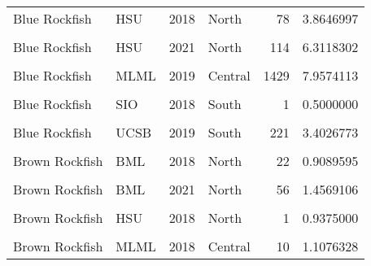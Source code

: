 \documentclass[
]{article}
\begin{document}
\begin{longtable}[t]{llrlrr}
Blue Rockfish & HSU & 2018 & North & 78 & 3.8646997\\
\addlinespace
\cellcolor{gray!6}{Blue Rockfish} & \cellcolor{gray!6}{HSU} & \cellcolor{gray!6}{2019} & \cellcolor{gray!6}{North} & \cellcolor{gray!6}{54} & \cellcolor{gray!6}{2.5111033}\\
Blue Rockfish & HSU & 2021 & North & 114 & 6.3118302\\
\cellcolor{gray!6}{Blue Rockfish} & \cellcolor{gray!6}{MLML} & \cellcolor{gray!6}{2018} & \cellcolor{gray!6}{Central} & \cellcolor{gray!6}{1866} & \cellcolor{gray!6}{9.9771759}\\
Blue Rockfish & MLML & 2019 & Central & 1429 & 7.9574113\\
\cellcolor{gray!6}{Blue Rockfish} & \cellcolor{gray!6}{MLML} & \cellcolor{gray!6}{2021} & \cellcolor{gray!6}{Central} & \cellcolor{gray!6}{473} & \cellcolor{gray!6}{3.3025650}\\
\addlinespace
Blue Rockfish & SIO & 2018 & South & 1 & 0.5000000\\
\cellcolor{gray!6}{Blue Rockfish} & \cellcolor{gray!6}{UCSB} & \cellcolor{gray!6}{2018} & \cellcolor{gray!6}{South} & \cellcolor{gray!6}{157} & \cellcolor{gray!6}{2.7541900}\\
Blue Rockfish & UCSB & 2019 & South & 221 & 3.4026773\\
\cellcolor{gray!6}{Blue Rockfish} & \cellcolor{gray!6}{UCSB} & \cellcolor{gray!6}{2021} & \cellcolor{gray!6}{South} & \cellcolor{gray!6}{222} & \cellcolor{gray!6}{2.8199352}\\
Brown Rockfish & BML & 2018 & North & 22 & 0.9089595\\
\addlinespace
\cellcolor{gray!6}{Brown Rockfish} & \cellcolor{gray!6}{BML} & \cellcolor{gray!6}{2019} & \cellcolor{gray!6}{North} & \cellcolor{gray!6}{61} & \cellcolor{gray!6}{1.8121751}\\
Brown Rockfish & BML & 2021 & North & 56 & 1.4569106\\
\cellcolor{gray!6}{Brown Rockfish} & \cellcolor{gray!6}{Cal Poly} & \cellcolor{gray!6}{2019} & \cellcolor{gray!6}{Central} & \cellcolor{gray!6}{2} & \cellcolor{gray!6}{0.6645613}\\
Brown Rockfish & HSU & 2018 & North & 1 & 0.9375000\\
\cellcolor{gray!6}{Brown Rockfish} & \cellcolor{gray!6}{HSU} & \cellcolor{gray!6}{2019} & \cellcolor{gray!6}{North} & \cellcolor{gray!6}{2} & \cellcolor{gray!6}{2.0000000}\\
\addlinespace
Brown Rockfish & MLML & 2018 & Central & 10 & 1.1076328\\

\end{longtable}
\end{document}
